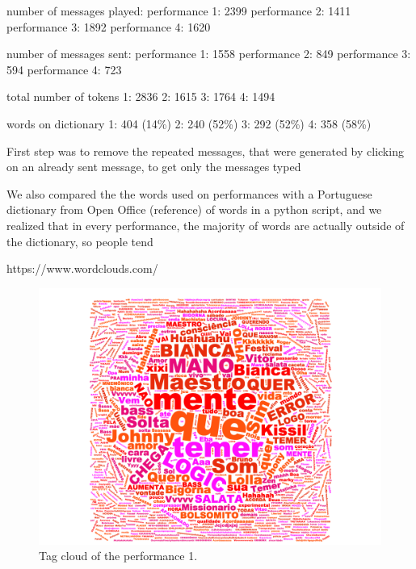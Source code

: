 \documentclass{aes2e}
\begin{document}
number of messages played:
performance 1: 2399
performance 2: 1411
performance 3: 1892
performance 4: 1620

number of messages sent:
performance 1: 1558
performance 2: 849
performance 3: 594
performance 4: 723

total number of tokens
1: 2836
2: 1615
3: 1764
4: 1494

words on dictionary
1: 404 (14\%)
2: 240  (52\%)
3: 292 	(52\%)
4: 358 (58\%)













First step was to remove the repeated messages, that were generated by clicking on an already sent message, to get only the messages typed



We also compared the the words used on performances with a Portuguese dictionary from Open Office (reference) of words in a python script, and we realized that in every performance, the majority of words are actually outside of the dictionary, so people tend 

https://www.wordclouds.com/

\begin{figure}
\centering
\includegraphics[width=1\linewidth]{img/wordcloud_performance1.png}
\caption{Tag cloud of the performance 1.}
\end{figure}
\end{document}
